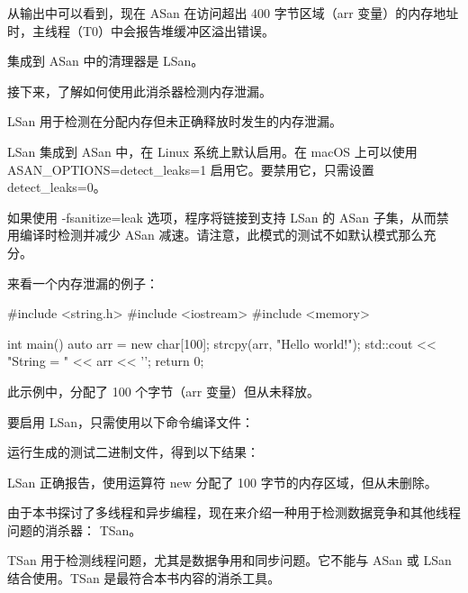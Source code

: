 从输出中可以看到，现在 ASan 在访问超出 400 字节区域（arr 变量）的内存地址时，主线程（T0）中会报告堆缓冲区溢出错误。

集成到 ASan 中的清理器是 LSan。

接下来，了解如何使用此消杀器检测内存泄漏。


LSan 用于检测在分配内存但未正确释放时发生的内存泄漏。

LSan 集成到 ASan 中，在 Linux 系统上默认启用。在 macOS 上可以使用 ASAN\_OPTIONS=detect\_leaks=1 启用它。要禁用它，只需设置 detect\_leaks=0。

如果使用 -fsanitize=leak 选项，程序将链接到支持 LSan 的 ASan 子集，从而禁用编译时检测并减少 ASan 减速。请注意，此模式的测试不如默认模式那么充分。

来看一个内存泄漏的例子：

\begin{cpp}
#include <string.h>
#include <iostream>
#include <memory>

int main() {
    auto arr = new char[100];
    strcpy(arr, "Hello world!");
    std::cout << "String = " << arr << '\n';
    return 0;
}
\end{cpp}

此示例中，分配了 100 个字节（arr 变量）但从未释放。

要启用 LSan，只需使用以下命令编译文件：


运行生成的测试二进制文件，得到以下结果：


LSan 正确报告，使用运算符 new 分配了 100 字节的内存区域，但从未删除。

由于本书探讨了多线程和异步编程，现在来介绍一种用于检测数据竞争和其他线程问题的消杀器： TSan。


TSan 用于检测线程问题，尤其是数据争用和同步问题。它不能与 ASan 或 LSan 结合使用。TSan 是最符合本书内容的消杀工具。

